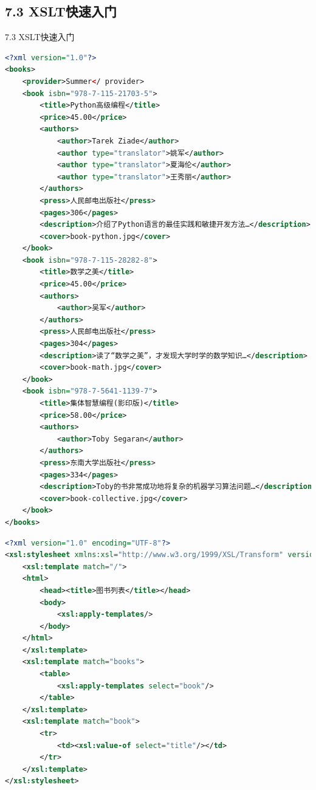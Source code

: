 \subsection{7.3 XSLT快速入门}

\begin{frame}{7.3 XSLT快速入门}
\begin{lstlisting}[tabsize=8, basicstyle=\small\tt, language=XML, caption="7-2.xml"]
<?xml version="1.0"?>
<books>
    <provider>Summer</ provider>
    <book isbn="978-7-115-21703-5">
        <title>Python高级编程</title>
        <price>45.00</price>
        <authors>
            <author>Tarek Ziade</author>
            <author type="translator">姚军</author>
            <author type="translator">夏海伦</author>
            <author type="translator">王秀丽</author>
        </authors>
        <press>人民邮电出版社</press>
        <pages>306</pages>
        <description>介绍了Python语言的最佳实践和敏捷开发方法…</description>
        <cover>book-python.jpg</cover>
    </book>
    <book isbn="978-7-115-28282-8">
        <title>数学之美</title>
        <price>45.00</price>
        <authors>
            <author>吴军</author>
        </authors>
        <press>人民邮电出版社</press>
        <pages>304</pages>
        <description>读了“数学之美”，才发现大学时学的数学知识…</description>
        <cover>book-math.jpg</cover>
    </book>
    <book isbn="978-7-5641-1139-7">
        <title>集体智慧编程(影印版)</title>
        <price>58.00</price>
        <authors>
            <author>Toby Segaran</author>
        </authors>
        <press>东南大学出版社</press>
        <pages>334</pages>
        <description>Toby的书非常成功地将复杂的机器学习算法问题…</description>
        <cover>book-collective.jpg</cover>
    </book>
</books>
\end{lstlisting}

\begin{lstlisting}[tabsize=8, basicstyle=\small\tt, language=XML, caption="7-2.xsl"]
<?xml version="1.0" encoding="UTF-8"?>
<xsl:stylesheet xmlns:xsl="http://www.w3.org/1999/XSL/Transform" version="2.0">
    <xsl:template match="/">
    <html>
        <head><title>图书列表</title></head>
        <body>
            <xsl:apply-templates/>
        </body>
    </html>
    </xsl:template>
    <xsl:template match="books">
        <table>
            <xsl:apply-templates select="book"/>
        </table>
    </xsl:template>
    <xsl:template match="book">
        <tr>
            <td><xsl:value-of select="title"/></td>
        </tr>
    </xsl:template>
</xsl:stylesheet>
\end{lstlisting}


\end{frame}
